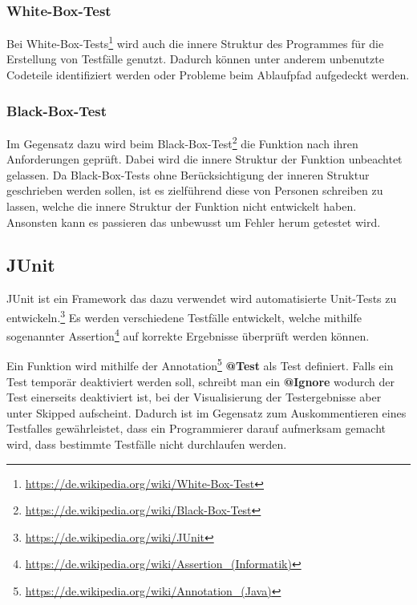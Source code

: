 \subsubsection{White-Box-Test}

Bei White-Box-Tests\footnote{\url{https://de.wikipedia.org/wiki/White-Box-Test}} wird auch die innere Struktur des Programmes f\"ur die Erstellung von Testf\"alle genutzt. Dadurch k\"onnen unter anderem unbenutzte Codeteile identifiziert werden oder Probleme beim Ablaufpfad aufgedeckt werden. 

\subsubsection{Black-Box-Test}

Im Gegensatz dazu wird beim Black-Box-Test\footnote{\url{https://de.wikipedia.org/wiki/Black-Box-Test}} die Funktion nach ihren Anforderungen gepr\"uft. Dabei wird die innere Struktur der Funktion unbeachtet gelassen. Da Black-Box-Tests ohne Ber\"ucksichtigung der inneren Struktur geschrieben werden sollen, ist es zielf\"uhrend diese von Personen schreiben zu lassen, welche die innere Struktur der Funktion nicht entwickelt haben. Ansonsten kann es passieren das unbewusst \glqq{}um Fehler herum\grqq{} getestet wird.

\newpage
\subsection{JUnit}

JUnit ist ein Framework das dazu verwendet wird automatisierte Unit-Tests zu entwickeln.\footnote{\url{https://de.wikipedia.org/wiki/JUnit}} Es werden verschiedene Testf\"alle entwickelt, welche mithilfe sogenannter Assertion\footnote{\url{https://de.wikipedia.org/wiki/Assertion_(Informatik)}} auf korrekte Ergebnisse \"uberpr\"uft werden k\"onnen.

Ein Funktion wird mithilfe der Annotation\footnote{\url{https://de.wikipedia.org/wiki/Annotation_(Java)}}  \textbf{@Test} als Test definiert. Falls ein Test tempor\"ar deaktiviert werden soll, schreibt man ein \textbf{@Ignore} wodurch der Test einerseits deaktiviert ist, bei der Visualisierung der Testergebnisse aber unter \glqq{}Skipped\grqq{} aufscheint. Dadurch ist im Gegensatz zum Auskommentieren eines Testfalles gew\"ahrleistet, dass ein Programmierer darauf aufmerksam gemacht wird, dass bestimmte Testf\"alle nicht durchlaufen werden.


